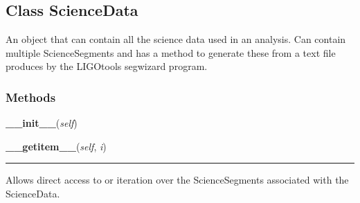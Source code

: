 
\subsection{Class ScienceData}

    \label{pipeline:ScienceData}
An object that can contain all the science data used in an analysis. Can 
contain multiple ScienceSegments and has a method to generate these from 
a text file produces by the LIGOtools segwizard program.



  \subsubsection{Methods}

    \label{pipeline:ScienceData:__init__}
    \vspace{0.5ex}

    \noindent\begin{boxedminipage}{\textwidth}

    \raggedright \textbf{\_\_init\_\_}(\textit{self})

    \end{boxedminipage}

    \label{pipeline:ScienceData:__getitem__}
    \vspace{0.5ex}

    \noindent\begin{boxedminipage}{\textwidth}

    \raggedright \textbf{\_\_getitem\_\_}(\textit{self}, \textit{i})

    \vspace{-1.5ex}

    \rule{\textwidth}{0.5\fboxrule}
    Allows direct access to or iteration over the ScienceSegments 
    associated with the ScienceData.

    \vspace{1ex}

    \end{boxedminipage}

